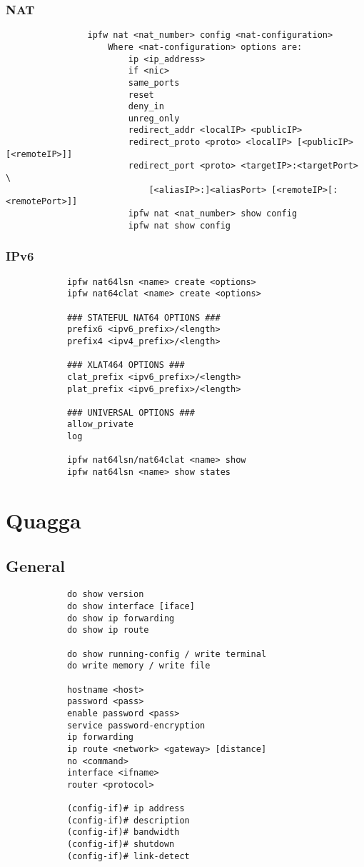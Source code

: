 \documentclass[a4paper, 12pt]{article}
\begin{document}
		\subsubsection{NAT}
			\begin{verbatim}
				ipfw nat <nat_number> config <nat-configuration>
				    Where <nat-configuration> options are:
				        ip <ip_address>
				        if <nic>
				        same_ports
				        reset
				        deny_in
				        unreg_only
				        redirect_addr <localIP> <publicIP>
				        redirect_proto <proto> <localIP> [<publicIP> [<remoteIP>]]
				        redirect_port <proto> <targetIP>:<targetPort> \
				            [<aliasIP>:]<aliasPort> [<remoteIP>[:<remotePort>]]
				        ipfw nat <nat_number> show config
				        ipfw nat show config
			\end{verbatim}
		
		\subsubsection{IPv6}
		
		\begin{verbatim}
			ipfw nat64lsn <name> create <options>
			ipfw nat64clat <name> create <options>
			
			### STATEFUL NAT64 OPTIONS ###
			prefix6 <ipv6_prefix>/<length>
			prefix4 <ipv4_prefix>/<length>
			
			### XLAT464 OPTIONS ###
			clat_prefix <ipv6_prefix>/<length>
			plat_prefix <ipv6_prefix>/<length>
			
			### UNIVERSAL OPTIONS ###
			allow_private
			log
			
			ipfw nat64lsn/nat64clat <name> show
			ipfw nat64lsn <name> show states
		\end{verbatim}	

\section{Quagga}
	\subsection{General}
		\begin{verbatim}		
			do show version
			do show interface [iface]
			do show ip forwarding
			do show ip route
					
			do show running-config / write terminal
			do write memory / write file
					
			hostname <host>
			password <pass>
			enable password <pass>
			service password-encryption
			ip forwarding 
			ip route <network> <gateway> [distance]
			no <command>
			interface <ifname>
			router <protocol>
					
			(config-if)# ip address
			(config-if)# description
			(config-if)# bandwidth
			(config-if)# shutdown
			(config-if)# link-detect
		\end{verbatim}
	
\end{document}
